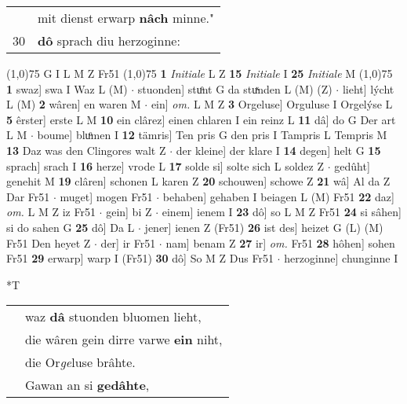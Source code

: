 \documentclass[8pt,a4paper,notitlepage]{article}
\begin{document}
\begin{table}[ht]
\begin{minipage}[t]{0.5\linewidth}
\begin{tabular}{rl}
 & mit dienst erwarp \textbf{nâch} minne."\\ 
30 & \textbf{dô} sprach diu herzoginne:\\ 
\end{tabular}
\scriptsize
\line(1,0){75} \newline
G I L M Z Fr51 \newline
\line(1,0){75} \newline
\textbf{1} \textit{Initiale} L Z  \textbf{15} \textit{Initiale} I  \textbf{25} \textit{Initiale} M  \newline
\line(1,0){75} \newline
\textbf{1} swaz] swa I Waz L (M)  $\cdot$ stuonden] stuͦnt G da stuͯnden L (M) (Z)  $\cdot$ lieht] lýcht L (M) \textbf{2} wâren] en waren M  $\cdot$ ein] \textit{om.} L M Z \textbf{3} Orgeluse] Orguluse I Orgelýse L \textbf{5} êrster] erste L M \textbf{10} ein clârez] einen chlaren I ein reinz L \textbf{11} dâ] do G Der art L M  $\cdot$ boume] bluͦmen I \textbf{12} tämris] Ten pris G den pris I Tampris L Tempris M \textbf{13} Daz was den Clingores walt Z  $\cdot$ der kleine] der klare I \textbf{14} degen] helt G \textbf{15} sprach] srach I \textbf{16} herze] vrode L \textbf{17} solde si] solte sich L soldez Z  $\cdot$ gedûht] genehit M \textbf{19} clâren] schonen L karen Z \textbf{20} schouwen] schowe Z \textbf{21} wâ] Al da Z Dar Fr51  $\cdot$ muget] mogen Fr51  $\cdot$ behaben] gehaben I beiagen L (M) Fr51 \textbf{22} daz] \textit{om.} L M Z iz Fr51  $\cdot$ gein] bi Z  $\cdot$ einem] ienem I \textbf{23} dô] so L M Z Fr51 \textbf{24} si sâhen] si do sahen G \textbf{25} dô] Da L  $\cdot$ jener] ienen Z (Fr51) \textbf{26} ist des] heizet G (L) (M) Fr51 Den heyet Z  $\cdot$ der] ir Fr51  $\cdot$ nam] benam Z \textbf{27} ir] \textit{om.} Fr51 \textbf{28} hôhen] sohen Fr51 \textbf{29} erwarp] warp I (Fr51) \textbf{30} dô] So M Z Dus Fr51  $\cdot$ herzoginne] chunginne I \newline
\end{minipage}
\hspace{0.5cm}
\begin{minipage}[t]{0.5\linewidth}
\small
\begin{center}*T
\end{center}
\begin{tabular}{rl}
 & waz \textbf{dâ} stuonden bluomen lieht,\\ 
 & die wâren gein dirre varwe \textbf{ein} niht,\\ 
 & die Or\textit{ge}luse brâhte.\\ 
 & Gawan an si \textbf{gedâhte},\\ 

\end{tabular}
\end{minipage}
\end{table}
\end{document}
